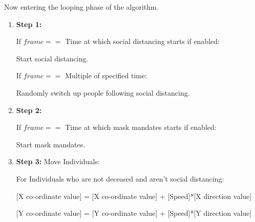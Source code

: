 \documentclass[11pt]{article}
\begin{document}
Now entering the looping phase of the algorithm.
\begin{enumerate}[label=\textbf{\arabic*})]
    \item \textbf{Step 1:} 
        
        If $frame ==$ Time at which social distancing starts if enabled:
        
        \hspace{10pt} Start social distancing.
        
        \hspace{10pt} If $frame ==$ Multiple of specified time:
        
        \hspace{20pt} Randomly switch up people following social distancing.
        
    \item \textbf{Step 2:}
    
        If $frame ==$ Time at which mask mandates starts if enabled:
        
        \hspace{10pt} Start mask mandates.
        
    \item \textbf{Step 3:} Move Individuals:
    
        For Individuals who are not deceased and aren't social distancing:
        
        \hspace{10pt} [X co-ordinate value] = [X co-ordinate value] + [Speed]*[X direction value]
        
        \hspace{10pt} [Y co-ordinate value] = [Y co-ordinate value] + [Speed]*[Y direction value]
    

\end{enumerate}
\end{document}
